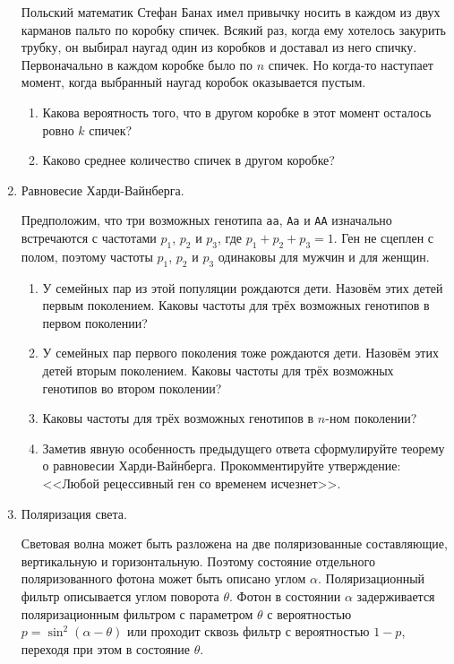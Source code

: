 \documentclass{tufte-handout}
\begin{document}
\begin{enumerate}
Польский математик Стефан Банах имел привычку носить в каждом из двух карманов пальто по коробку спичек. Всякий раз, когда ему хотелось закурить трубку, он выбирал наугад один из коробков и доставал из него спичку. Первоначально в каждом коробке было по $n$ спичек. Но когда-то наступает момент, когда выбранный наугад коробок оказывается пустым.

\begin{enumerate}
\item Какова вероятность того, что в другом коробке в этот момент осталось ровно $k$ спичек?
\item Каково среднее количество спичек в другом коробке?
\end{enumerate}


\item Равновесие Харди-Вайнберга. 

Предположим, что три возможных генотипа \verb|aa|, \verb|Aa| и \verb|AA| изначально встречаются с частотами $p_1$, $p_2$ и $p_3$, где $p_1+p_2+p_3=1$. Ген не сцеплен с полом, поэтому частоты $p_1$, $p_2$ и $p_3$ одинаковы для мужчин и для женщин. 
\begin{enumerate}
\item У семейных пар из этой популяции рождаются дети. Назовём этих детей первым поколением. Каковы частоты для трёх возможных генотипов в первом поколении? 
\item У семейных пар первого поколения тоже рождаются дети. Назовём этих детей вторым поколением. Каковы частоты для трёх возможных генотипов во втором поколении? 
\item Каковы частоты для трёх возможных генотипов в $n$-ном поколении?
\item Заметив явную особенность предыдущего ответа сформулируйте теорему о равновесии Харди-Вайнберга. Прокомментируйте утверждение: <<Любой рецессивный ген со временем исчезнет>>.
\end{enumerate}

\item Поляризация света.

Световая волна может быть разложена на две поляризованные составляющие, вертикальную и горизонтальную. Поэтому состояние отдельного поляризованного фотона может быть описано углом $\alpha$. Поляризационный фильтр описывается углом поворота $\theta$. Фотон в состоянии $\alpha$ задерживается поляризационным фильтром с параметром $\theta$ с вероятностью $p=\sin^2(\alpha-\theta)$ или проходит сквозь фильтр с вероятностью $1-p$, переходя при этом в состояние $\theta$. 


\end{enumerate}
\end{document}
